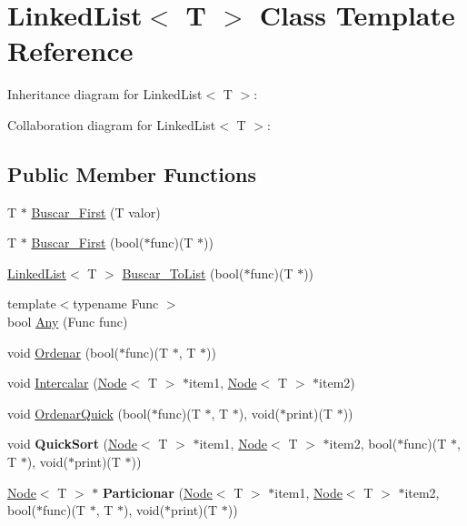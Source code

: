 \hypertarget{class_linked_list}{}\section{Linked\+List$<$ T $>$ Class Template Reference}
\label{class_linked_list}


Inheritance diagram for Linked\+List$<$ T $>$\+:


Collaboration diagram for Linked\+List$<$ T $>$\+:
\subsection*{Public Member Functions}
\begin{DoxyCompactItemize}
\item 
T $\ast$ \hyperlink{class_linked_list_a7672e27fa087b1f84de2f02c59d023be}{Buscar\+\_\+\+First} (T valor)
\item 
T $\ast$ \hyperlink{class_linked_list_a72dfe042b0983692bcba64fb478130b8}{Buscar\+\_\+\+First} (bool($\ast$func)(T $\ast$))
\item 
\hyperlink{class_linked_list}{Linked\+List}$<$ T $>$ \hyperlink{class_linked_list_a7cd61556956370c609c09415f3535663}{Buscar\+\_\+\+To\+List} (bool($\ast$func)(T $\ast$))
\item 
{\footnotesize template$<$typename Func $>$ }\\bool \hyperlink{class_linked_list_afdc8067e3c23217a0e74e8ac1a7637e5}{Any} (Func func)
\item 
void \hyperlink{class_linked_list_a07e81568782c14c4090de29b627891bd}{Ordenar} (bool($\ast$func)(T $\ast$, T $\ast$))
\item 
void \hyperlink{class_linked_list_ae001c1e96e64ad4e66453663f2f37c72}{Intercalar} (\hyperlink{class_node}{Node}$<$ T $>$ $\ast$item1, \hyperlink{class_node}{Node}$<$ T $>$ $\ast$item2)
\item 
void \hyperlink{class_linked_list_a0b0a614771578800ecc82f87c9c1b1b8}{Ordenar\+Quick} (bool($\ast$func)(T $\ast$, T $\ast$), void($\ast$print)(T $\ast$))
\item 
void {\bfseries Quick\+Sort} (\hyperlink{class_node}{Node}$<$ T $>$ $\ast$item1, \hyperlink{class_node}{Node}$<$ T $>$ $\ast$item2, bool($\ast$func)(T $\ast$, T $\ast$), void($\ast$print)(T $\ast$))\hypertarget{class_linked_list_a1a5854fef17fe7f13da6ad276a2ea58e}{}\label{class_linked_list_a1a5854fef17fe7f13da6ad276a2ea58e}

\item 
\hyperlink{class_node}{Node}$<$ T $>$ $\ast$ {\bfseries Particionar} (\hyperlink{class_node}{Node}$<$ T $>$ $\ast$item1, \hyperlink{class_node}{Node}$<$ T $>$ $\ast$item2, bool($\ast$func)(T $\ast$, T $\ast$), void($\ast$print)(T $\ast$))\hypertarget{class_linked_list_ac39ffab7f68d32127b539a5e96888a00}{}\label{class_linked_list_ac39ffab7f68d32127b539a5e96888a00}

\end{DoxyCompactItemize}
